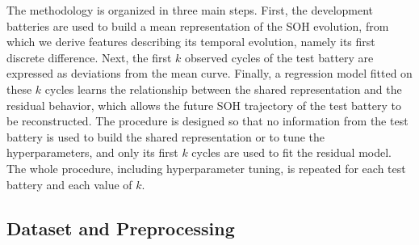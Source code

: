 \documentclass[conference]{IEEEtran}
\begin{document}
The methodology is organized in three main steps. First, the development batteries are used to build a mean representation of the SOH evolution, from which we derive features describing its temporal evolution, namely its first discrete difference. Next, the first $k$ observed cycles of the test battery are expressed as deviations from the mean curve. Finally, a regression model fitted on these $k$ cycles learns the relationship between the shared representation and the residual behavior, which allows the future SOH trajectory of the test battery to be reconstructed. The procedure is designed so that no information from the test battery is used to build the shared representation or to tune the hyperparameters, and only its first $k$ cycles are used to fit the residual model. The whole procedure, including hyperparameter tuning, is repeated for each test battery and each value of $k$.


\subsection{Dataset and Preprocessing}
\label{subsec:base_dados}
\end{document}
